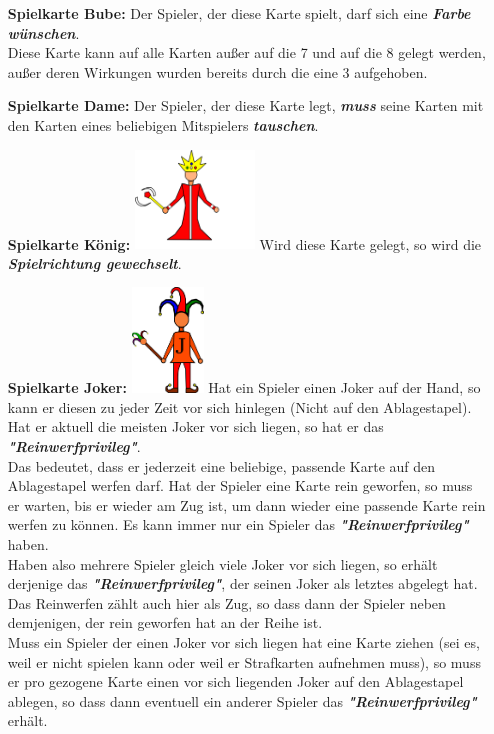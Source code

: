 \documentclass{article}
\begin{document}
\begin{itemize}
\item[\textbf{Spielkarte Bube:}]
Der Spieler, der diese Karte spielt, darf sich eine \textit{\textbf{Farbe wünschen}}. \\ Diese Karte kann auf alle Karten außer auf die 7 und auf die 8 gelegt werden, außer deren Wirkungen wurden bereits durch die eine 3 aufgehoben.
\item[\textbf{Spielkarte Dame:}]
Der Spieler, der diese Karte legt, \textit{\textbf{muss}} seine Karten mit den Karten eines beliebigen Mitspielers \textit{\textbf{tauschen}}.
\item[\textbf{Spielkarte König:}]
\includegraphics[width=0.25\textwidth]{photos/king.png}
Wird diese Karte gelegt, so wird die \textit{\textbf{Spielrichtung gewechselt}}.
\item[\textbf{Spielkarte Joker:}]
\includegraphics[width=0.15\textwidth]{photos/joker.png}
Hat ein Spieler einen Joker auf der Hand, so kann er diesen zu jeder Zeit vor sich hinlegen (Nicht auf den Ablagestapel). Hat er aktuell die meisten Joker vor sich liegen, so hat er das \textit{\textbf{"Reinwerfprivileg"}}. \\
Das bedeutet, dass er jederzeit eine beliebige, passende Karte auf den Ablagestapel werfen darf. Hat der Spieler eine Karte rein geworfen, so muss er warten, bis er wieder am Zug ist, um dann wieder eine passende Karte rein werfen zu können. Es kann immer nur ein Spieler das \textit{\textbf{"Reinwerfprivileg"}} haben. \\
Haben also mehrere Spieler gleich viele Joker vor sich liegen, so erhält derjenige das \textit{\textbf{"Reinwerfprivileg"}}, der seinen Joker als letztes abgelegt hat.  \\
Das Reinwerfen zählt auch hier als Zug, so dass dann der Spieler neben demjenigen, der rein geworfen hat an der Reihe ist. \\
Muss ein Spieler der einen Joker vor sich liegen hat eine Karte ziehen (sei es, weil er nicht spielen kann oder weil er Strafkarten aufnehmen muss), so muss er pro gezogene Karte einen vor sich liegenden Joker auf den Ablagestapel ablegen, so dass dann eventuell ein anderer Spieler das \textit{\textbf{"Reinwerfprivileg"}} erhält.
\end{itemize}
\end{document}
